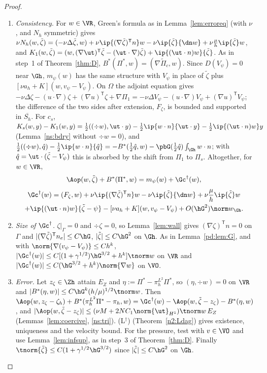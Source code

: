 \begin{proof}
\begin{enumerate}
\item \emph{Consistency.} For $w\in\VR$, Green's formula as in Lemma~\ref{lem:erroreq} (with $\nu$, and $N_h$ symmetric) gives
$\nu N_h(w,\tilde\zeta)=(-\nu\Delta\tilde\zeta,w)+\nu\ip{(\nabla\tilde\zeta)^{\mathsf T}n}w-\nu\ip{\tilde\zeta}{\dn w}+\nu\frac\mu h\ip{\tilde\zeta}w$, and
$K_1(w,\tilde\zeta)=(w,(\nabla\ut)^{\mathsf T}\tilde\zeta-(\ut\cdot\nabla)\tilde\zeta)+\ip{(\ut\cdot n)w}{\tilde\zeta}$. As in step~1 of Theorem~\ref{thm:D},
$B^\ast(\Pi^\ast,w)=(\nabla\tilde\Pi_c,w)$. Since $D(V_\psi)=0$ near $\Gh$, $m_\psi(w)$ has the same structure with $V_\psi$ in place of $\tilde\zeta$ plus
$[\nu a_h+K](w,v_\psi-V_\psi)$. On $\Omega$ the adjoint equation gives $-\nu\Delta\zeta-(u\cdot\nabla)\zeta+(\nabla u)^{\mathsf T}\zeta+\nabla\Pi_1=-\nu\Delta V_\psi-(u\cdot\nabla)V_\psi+(\nabla u)^{\mathsf T}V_\psi$;
the difference of the two sides after extension, $F_\zeta$, is bounded and supported in $\overline{S_h}$. For $c_s$,
$K_s(w,y)-K_1(w,y)=\frac12((\div w),\ut\cdot y)-\frac12\ip{w\cdot n}{\ut\cdot y}-\frac12\ip{(\ut\cdot n)w}y$ (Lemma~\ref{ns:bdry} without $\div w=0$), and
$\frac12((\div w),\hat q)-\frac12\ip{w\cdot n}{\hat q}=-B^\ast(\frac12\hat q,w)-\pbG(\frac12\hat q)\int_{\Gh}w\cdot n$; with $\hat q=\ut\cdot(\tilde\zeta-V_\psi)$ this is
absorbed by the shift from $\Pi_1$ to $\Pi_s$. Altogether, for $w\in\VR$,
\[
\Aop(w,\tilde\zeta)+B^\ast(\Pi^\ast,w)=m_\psi(w)+\Gc^\dagger(w),
\]
\begin{multline*}
\Gc^\dagger(w)=(F_\zeta,w)+\nu\ip{(\nabla\tilde\zeta)^{\mathsf T}n}w-\nu\ip{\tilde\zeta}{\dn w}+\nu\frac\mu h\ip{\tilde\zeta}w\\
+\ip{(\ut\cdot n)w}{\tilde\zeta-\psi}-[\nu a_h+K](w,v_\psi-V_\psi)+O(\hG^2)\norm w_{\Gh}.
\end{multline*}
\item \emph{Size of $\Gc^\dagger$.} $\zeta|_\Gamma=0$ and $\div\zeta=0$, so Lemma~\ref{lem:wall} gives $(\nabla\zeta)^{\mathsf T}n=0$ on $\Gamma$ and
$|(\nabla\tilde\zeta)^{\mathsf T}n_e|\le C\hG$, $|\tilde\zeta|\le C\hG^2$ on $\Gh$. As in Lemma~\ref{pd:lem:G}, and with $\norm{\nabla(v_\psi-V_\psi)}\le Ch^k$,
$|\Gc^\dagger(w)|\le C[(1+\gamma^{1/2})\hG^{3/2}+h^k]\tnorm w$ on $\VR$ and $|\Gc^\dagger(w)|\le C(\hG^{3/2}+h^k)\norm{\nabla w}$ on $\VO$.
\item \emph{Error.} Let $z_\zeta\in\Zh$ attain $E_Z$ and $\eta:=\Pi^\ast-\pi_h^{L^2}\Pi^\ast$, so $(\eta,\div w)=0$ on $\VR$ and $|B^\ast(\eta,w)|\le C\hG^k(h/\mu)^{1/2}\tnorm w$.
Then $\Aop(w,z_\zeta-\zeta_h)+B^\ast(\pi_h^{L^2}\Pi^\ast-\pi_h,w)=\Gc^\dagger(w)-\Aop(w,\tilde\zeta-z_\zeta)-B^\ast(\eta,w)$, and
$|\Aop(w,\tilde\zeta-z_\zeta)|\le(\nu M+2NC_1\norm{\ut}_{H^1})\tnorm w\,E_Z$ (Lemmas~\ref{lem:coercive}, \ref{ns:tri}). (L$^\dagger$) (Theorem~\ref{n2:Ldag}) gives
existence, uniqueness and the velocity bound. For the pressure, test with $v\in\VO$ and use Lemma~\ref{lem:infsup}, as in step~3 of Theorem~\ref{thm:D}.
Finally $\tnorm{\tilde\zeta}\le C(1+\gamma^{1/2}\hG^{3/2})$ since $|\tilde\zeta|\le C\hG^2$ on $\Gh$.\qedhere
\end{enumerate}
\end{proof}

